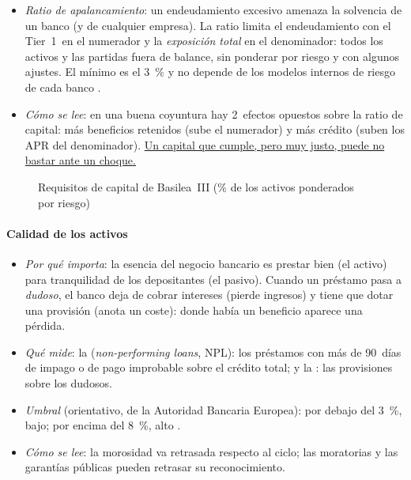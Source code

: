 \documentclass[11pt]{article}
\begin{document}
\begin{itemize}
\item \emph{Ratio de apalancamiento}: un endeudamiento excesivo amenaza la solvencia de un banco (y de cualquier empresa). La ratio limita el endeudamiento con el Tier~1~en el numerador y la \emph{exposición total} en el denominador: todos los activos y las partidas fuera de balance, sin ponderar por riesgo y con algunos ajustes. El mínimo es el 3~\% y no depende de los modelos internos de riesgo de cada banco \parencite{BCBS2017Basel3}.
\item \emph{Cómo se lee}: en una buena coyuntura hay 2~efectos opuestos sobre la ratio de capital: más beneficios retenidos (sube el numerador) y más crédito (suben los APR del denominador). \uline{Un capital que cumple, pero muy justo, puede no bastar ante un choque.}
\end{itemize}

\begin{figure}[!htb]
\centering
\caption{Requisitos de capital de Basilea~III (\% de los activos ponderados por riesgo)}\label{fig:esquema-basilea}
\end{figure}

\paragraph{Calidad de los activos}
\begin{itemize}
\item \emph{Por qué importa}: la esencia del negocio bancario es prestar bien (el activo) para tranquilidad de los depositantes (el pasivo). Cuando un préstamo pasa a \emph{dudoso}, el banco deja de cobrar intereses (pierde ingresos) y tiene que dotar una provisión (anota un coste): donde había un beneficio aparece una pérdida.
\item \emph{Qué mide}: la  (\emph{non-performing loans}, NPL): los préstamos con más de 90~días de impago o de pago improbable sobre el crédito total; y la : las provisiones sobre los dudosos.
\item \emph{Umbral} (orientativo, de la Autoridad Bancaria Europea): por debajo del 3~\%, bajo; por encima del 8~\%, alto \parencite{ABE2026RiskDashboard}.
\item \emph{Cómo se lee}: la morosidad va retrasada respecto al ciclo; las moratorias y las garantías públicas pueden retrasar su reconocimiento.
\end{itemize}
\end{document}
